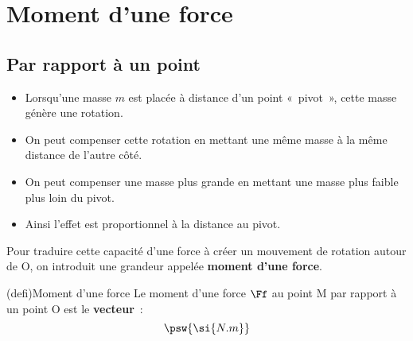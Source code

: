 \documentclass[../../main/main.tex]{subfiles}
\begin{document}
\section{Moment d'une force}
\subsection{Par rapport à un point}
\begin{itemize}
	\item Lorsqu'une masse $m$ est placée à distance d'un point «~pivot~», cette
	      masse génère une rotation.
	\item On peut compenser cette rotation en mettant une même masse à la même
	      distance de l'autre côté.
	\item On peut compenser une masse plus grande en mettant une masse plus
	      faible plus loin du pivot.
	\item Ainsi l'effet est proportionnel à la distance au pivot.
\end{itemize}

\begin{isd}
	\begin{center}
	\end{center}
	\tcblower
	\begin{center}
	\end{center}
\end{isd}

Pour traduire cette capacité d'une force à créer un mouvement de rotation autour
de O, on introduit une grandeur appelée \textbf{moment d'une force}.

\begin{tcb*}[sidebyside, righthand ratio=.2](defi){Moment d'une force}
	Le moment d'une force $\Ff$ au point M par rapport à un point O est le
	\textbf{vecteur}~:
	\psw{
		\[\boxed{\Mcf_{\Or}(\Ff) = \OM\wedge\Ff}\]
	}
	\tcblower
	\[
		\psw{
			\si{N.m}
		}
	\]
\end{tcb*}
\end{document}
